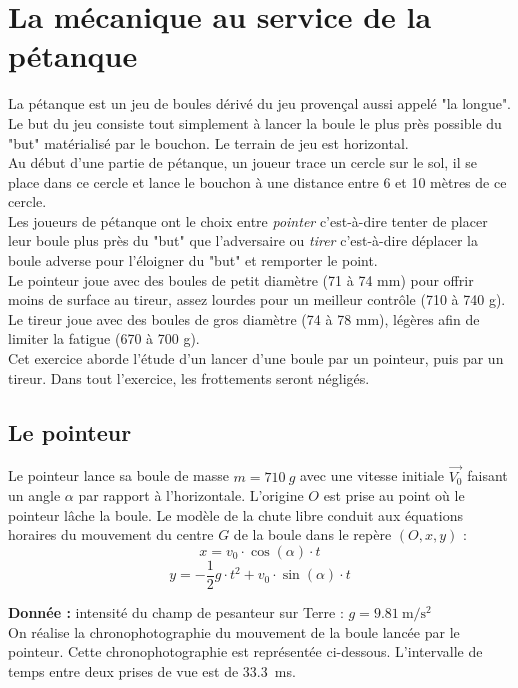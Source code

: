 \documentclass[a4paper,12pt,fleqn]{article}%
\begin{document}
\section{La mécanique au service de la pétanque}
La pétanque est un jeu de boules dérivé du jeu provençal aussi appelé "la longue". Le but du jeu consiste tout simplement à lancer la boule le plus près possible du "but" matérialisé par le bouchon. Le terrain de jeu est horizontal.\\
Au début d'une partie de pétanque, un joueur trace un cercle sur le sol, il se place dans ce cercle et lance le bouchon à une distance entre 6 et 10 mètres de ce cercle.\\
Les joueurs de pétanque ont le choix entre \textit{pointer} c'est-à-dire tenter de placer leur boule plus près du "but" que l'adversaire ou \textit{tirer} c'est-à-dire déplacer la boule adverse pour l'éloigner du "but" et remporter le point.\\
Le pointeur joue avec des boules de petit diamètre (71 à 74 mm) pour offrir moins de surface au tireur, assez lourdes pour un meilleur contrôle (710 à 740 g). Le tireur joue avec des boules de gros diamètre (74 à 78 mm), légères afin de limiter la fatigue (670 à 700 g).\\
Cet exercice aborde l'étude d'un lancer d'une boule par un pointeur, puis par un tireur. Dans tout l'exercice, les frottements seront négligés.
\subsection{Le pointeur}
Le pointeur lance sa boule de masse $m=\SI{710}{g}$ avec une vitesse initiale $\Vec{V_0}$ faisant un angle $\alpha$ par rapport à l'horizontale. L'origine $O$ est prise au point où le pointeur lâche la boule. Le modèle de la chute libre conduit aux équations horaires du mouvement du centre $G$ de la boule dans le repère $(O,x,y)$ :
$$x=v_0 \cdot \cos(\alpha)\cdot t$$
$$y = -\dfrac{1}{2} g \cdot t^2 + v_0 \cdot \sin(\alpha)\cdot t$$

\textbf{Donnée :} intensité du champ de pesanteur sur Terre : $g=\SI{9,81}{\meter\per\second\squared}$\\

On réalise la chronophotographie du mouvement de la boule lancée par le pointeur. Cette chronophotographie est représentée ci-dessous. L'intervalle de temps entre deux prises de vue est de \SI{33,3}{ms}.
\end{document}
